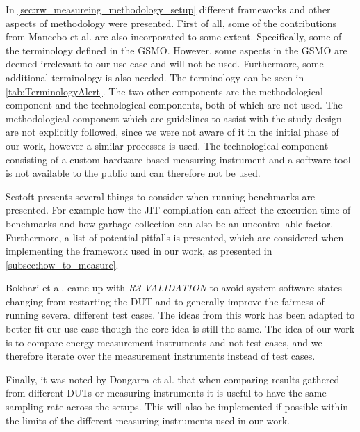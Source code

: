 
In \cref{sec:rw_measureing_methodology_setup} different frameworks and other aspects of methodology were presented. First of all, some of the contributions from Mancebo et al. \cite{GarciaFEETINGS} are also incorporated to some extent. Specifically, some of the terminology defined in the GSMO. However, some aspects in the GSMO are deemed irrelevant to our use case and will not be used. Furthermore, some additional terminology is also needed. The terminology can be seen in \cref{tab:TerminologyAlert}. The two other components are the methodological component and the technological components, both of which are not used. The methodological component which are guidelines to assist with the study design are not explicitly followed, since we were not aware of it in the initial phase of our work, however a similar processes is used. The technological component consisting of a custom hardware-based measuring instrument and a software tool is not available to the public and can therefore not be used.

Sestoft\cite{sestoft2013microbenchmarks} presents several things to consider when running benchmarks are presented. For example how the JIT compilation can affect the execution time of benchmarks and how garbage collection can also be an uncontrollable factor. Furthermore, a list of potential pitfalls is presented, which are considered when implementing the framework used in our work, as presented in \cref{subsec:how_to_measure}.

Bokhari et al.\cite{Bokhari2020r3} came up with \textit{R3-VALIDATION} to avoid system software states changing from restarting the DUT and to generally improve the fairness of running several different test cases. The ideas from this work has been adapted to better fit our use case though the core idea is still the same. The idea of our work is to compare energy measurement instruments and not test cases, and we therefore iterate over the measurement instruments instead of test cases.

Finally, it was noted by Dongarra et al.\cite{Dongarra2012} that when comparing results gathered from different DUTs or measuring instruments it is useful to have the same sampling rate across the setups. This will also be implemented if possible within the limits of the different measuring instruments used in our work.

